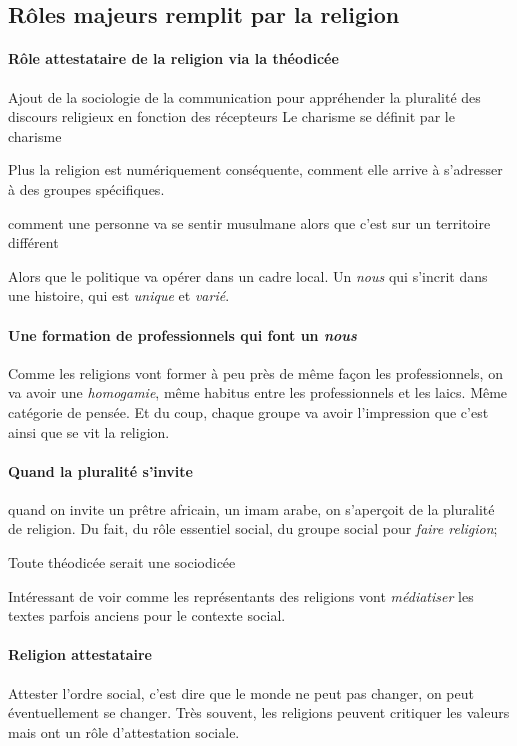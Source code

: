 \subsection{ Rôles majeurs remplit par la religion}

\paragraph{Rôle attestataire de la religion via la théodicée}
\begin{Prop}
         Ajout de la sociologie de la communication pour appréhender la pluralité des discours religieux en fonction des récepteurs Le charisme se définit par le charisme   
\end{Prop}
Plus la religion est numériquement conséquente, comment elle arrive à s'adresser à des groupes spécifiques. 
\begin{Ex}
    comment une personne va se sentir musulmane alors que c'est sur un territoire différent
\end{Ex}
Alors que le politique va opérer dans un cadre local. Un \textit{nous} qui s'incrit dans une histoire, qui est \textit{unique} et \textit{varié}.

\paragraph{Une formation de professionnels qui font un \textit{nous}} Comme les religions vont former à peu près de même façon les professionnels, on va avoir une \textit{homogamie}, même habitus entre les professionnels et les laics. Même catégorie de pensée. Et du coup, chaque groupe va avoir l'impression que c'est ainsi que se vit la religion.

\paragraph{Quand la pluralité s'invite} quand on invite un prêtre africain, un imam arabe, on s'aperçoit de la pluralité de religion.
Du fait, du rôle essentiel social, du groupe social pour \textit{faire religion}; 
\begin{Prop}
    Toute théodicée serait une sociodicée
\end{Prop}

      Intéressant de voir comme les représentants des religions vont \textit{médiatiser } les textes parfois anciens pour le contexte social.

\paragraph{Religion attestataire} Attester l'ordre social, c'est dire que le monde ne peut pas changer, on peut éventuellement se changer. Très souvent, les religions peuvent critiquer les valeurs mais ont un rôle d'attestation sociale.

